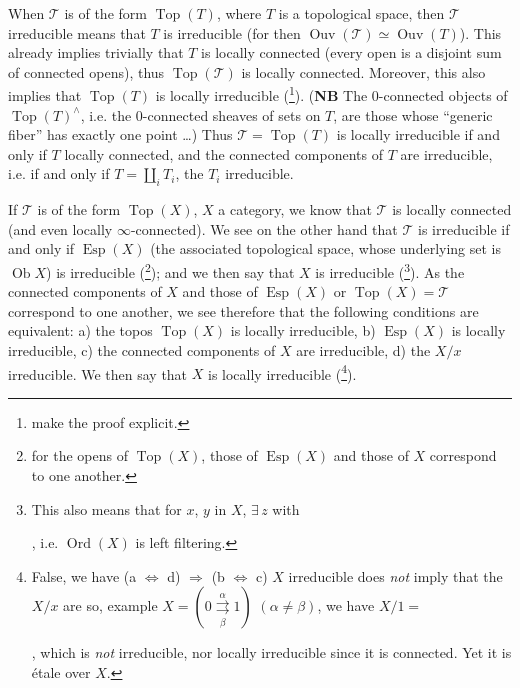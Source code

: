 When $\mathcal{T}$ is of the form $\operatorname{Top}(T)$, where $T$ is a topological space, then $\mathcal{T}$ irreducible means that $T$ is irreducible (for then $\operatorname{Ouv}(\mathcal{T}) \simeq \operatorname{Ouv}(T)$). This already implies trivially that $T$ is locally connected (every open is a disjoint sum of connected opens), thus $\operatorname{Top}(\mathcal{T})$ is locally connected. Moreover, this also implies that $\operatorname{Top}(T)$ is locally irreducible (\footnote[7]{make the proof explicit.}). (\textbf{NB} The 0-connected objects %
of $\operatorname{Top}(T)^\wedge$, i.e. the 0-connected sheaves of sets on $T$, are those whose ``generic fiber'' has exactly one point \dots) Thus $\mathcal{T} = \operatorname{Top}(T)$ is locally irreducible if and only if $T$ locally connected, and the connected components of $T$ are irreducible, i.e. if and only if $T = \coprod_i T_i$, the $T_i$ irreducible.

If $\mathcal{T}$ is of the form $\operatorname{Top}(X)$, $X$ a category, we know that $\mathcal{T}$ is locally connected (and even locally $\infty$-connected). We see on the other hand that $\mathcal{T}$ is irreducible if and only if $\operatorname{Esp}(X)$ (the associated topological space, whose underlying set is $\operatorname{Ob} X$) is irreducible (\footnote[8]{for the opens of $\operatorname{Top}(X)$, those of $\operatorname{Esp}(X)$ and those of $X$ correspond to one another.}); and we then say that $X$ is irreducible (\footnote[9]{This also means that for $x$, $y$ in $X$, $\exists\, z$ with , i.e. $\operatorname{Ord}(X)$ is left filtering.}). As the connected components of $X$ and those of $\operatorname{Esp}(X)$ or $\operatorname{Top}(X) = \mathcal{T}$ correspond to one another, we see therefore that the following conditions are equivalent: a) the topos $\operatorname{Top}(X)$ is locally irreducible, b)
$\operatorname{Esp}(X)$ is locally irreducible, c) the connected components of $X$ are irreducible, d) the $X/x$ irreducible. We then say that $X$ is locally irreducible (\footnote[10]{False, we have (a $\Longleftrightarrow$ d) $\Longrightarrow$ (b $\Longleftrightarrow$ c) $X$ irreducible does \textit{not} imply that the $X/x$ are so, example $X = (0 \overset{\alpha}{\underset{\beta}{\rightrightarrows}} 1)$ $(\alpha \neq \beta)$, we have $X/1 =$ , which is \textit{not} irreducible, nor locally irreducible since it is connected. Yet it is étale over $X$.}).

